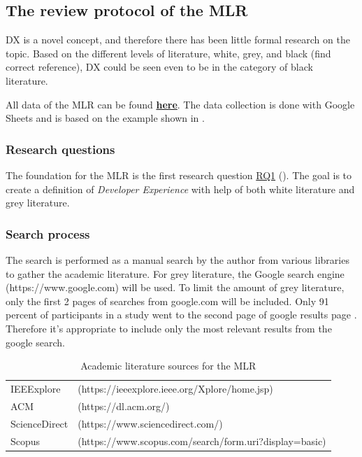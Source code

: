 \documentclass[english, 12pt, a4paper, sci, utf8, a-1b, online]{aaltothesis}
\begin{document}
\subsection{The review protocol of the MLR}

DX is a novel concept, and therefore there has been little formal research on the topic. Based on the different levels of literature, white, grey, and black \citep{guidelines-for-MLR} (find correct reference), DX could be seen even to be in the category of black literature.

\newcommand{\mlrdxlink}{https://docs.google.com/spreadsheets/d/1BLX4eQypAvxd3Gzft0s0rqUHdMYaKxPAbpZZ4dAvJqU/edit?usp=sharing}

All data of the MLR can be found \href{\mlrdxlink}{\textbf{here}}. The data collection is done with Google Sheets and is based on the example shown in \citep{guidelines-for-MLR}.

\subsubsection{Research questions}

The foundation for the MLR is the first research question \hyperref[RQ1]{RQ1} (\rqone). The goal is to create a definition of \textit{Developer Experience} with help of both white literature and grey literature.

\subsubsection{Search process}

The search is performed as a manual search by the author from various libraries to gather the academic literature. For grey literature, the Google search engine (https://www.google.com) will be used. To limit the amount of grey literature, only the first 2 pages of searches from google.com will be included. Only 91 percent of participants in a study went to the second page of google results page \citep{google-search}. Therefore it's appropriate to include only the most relevant results from the google search.

\begin{table}[H]
  \begin{tabular}{ l l }
    IEEExplore    & (https://ieeexplore.ieee.org/Xplore/home.jsp)          \\
    ACM           & (https://dl.acm.org/)                                  \\
    ScienceDirect & (https://www.sciencedirect.com/)                       \\
    Scopus        & (https://www.scopus.com/search/form.uri?display=basic)
  \end{tabular}
  \caption{Academic literature sources for the MLR}
\end{table}
\end{document}
